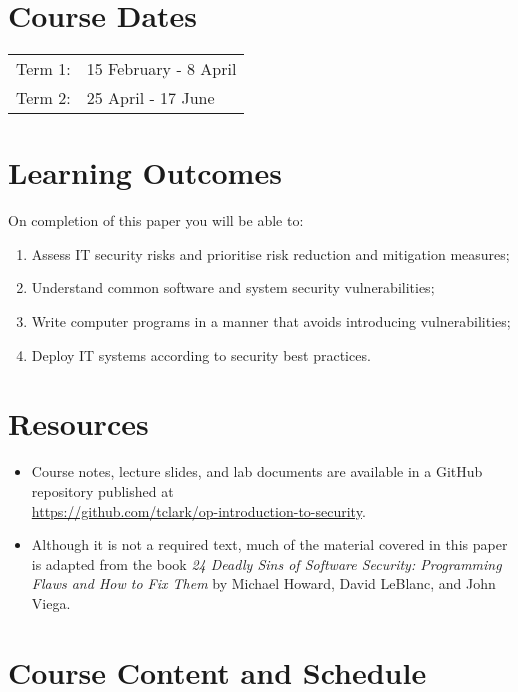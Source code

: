 \documentclass{article}
\begin{document}
\section*{Course Dates}
\begin{tabular}{ll}
	Term 1:  & 15 February - 8 April\\
	Term 2:  & 25 April - 17 June\\
\end{tabular}

\newpage 

\section*{Learning Outcomes}
On completion of this paper you will be able to:
\begin{enumerate}
  \item Assess IT security risks and prioritise risk reduction and
	  mitigation measures;
  \item Understand common software and system security vulnerabilities;
  \item Write computer programs in a manner that avoids introducing 
	  vulnerabilities;
  \item Deploy IT systems according to security best practices.
\end{enumerate}

\section*{Resources}
\begin{itemize}
	\item Course notes, lecture slides, and lab documents are available in a GitHub 
		repository published at \\ \url{https://github.com/tclark/op-introduction-to-security}.
	\item Although it is not a required text, much of the material covered in this paper is 
		adapted from the book \emph{24 Deadly Sins of Software Security: Programming Flaws and 
		How to Fix Them} by Michael Howard, David LeBlanc, and John Viega.
	
\end{itemize}


\section*{Course Content and Schedule}
\end{document}
